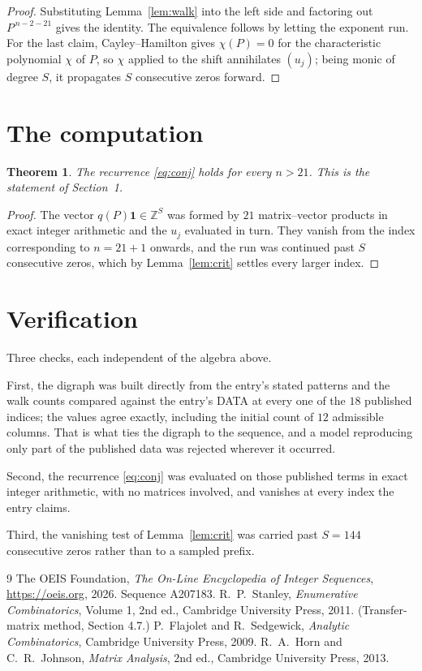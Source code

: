 \documentclass[11pt,a4paper]{article}
\theoremstyle{plain}
\newtheorem{theorem}{Theorem}
\theoremstyle{definition}
\begin{document}
\begin{proof}
Substituting Lemma~\ref{lem:walk} into the left side and factoring out
$P^{\,n-2-21}$ gives the identity. The equivalence follows by letting the exponent
run. For the last claim, Cayley--Hamilton gives $\chi(P)=0$ for the characteristic
polynomial $\chi$ of $P$, so $\chi$ applied to the shift annihilates $(u_j)$; being monic of
degree $S$, it propagates $S$ consecutive zeros forward.
\end{proof}

\section{The computation}

\begin{theorem}
The recurrence \eqref{eq:conj} holds for every $n>21$. This is the statement of
Section~1.
\end{theorem}

\begin{proof}
The vector $q(P)\mathbf{1}\in\mathbb{Z}^{S}$ was formed by $21$ matrix--vector
products in exact integer arithmetic and the $u_j$ evaluated in turn. They vanish from the
index corresponding to $n=21+1$ onwards, and the run was continued past $S$ consecutive
zeros, which by Lemma~\ref{lem:crit} settles every larger index.
\end{proof}

\section{Verification}

Three checks, each independent of the algebra above.

First, the digraph was built directly from the entry's stated patterns and the walk counts
compared against the entry's DATA at every one of the $18$ published indices; the
values agree exactly, including the initial count of $12$ admissible columns. That is
what ties the digraph to the sequence, and a model reproducing only part of the published
data was rejected wherever it occurred.

Second, the recurrence \eqref{eq:conj} was evaluated on those published terms in exact
integer arithmetic, with no matrices involved, and vanishes at every index the entry claims.

Third, the vanishing test of Lemma~\ref{lem:crit} was carried past $S=144$ consecutive
zeros rather than to a sampled prefix.

\begin{thebibliography}{9}
 The OEIS Foundation, \emph{The On-Line Encyclopedia of Integer
Sequences}, \url{https://oeis.org}, 2026. Sequence A207183.
 R.~P.~Stanley, \emph{Enumerative Combinatorics}, Volume 1, 2nd ed.,
Cambridge University Press, 2011. (Transfer-matrix method, Section 4.7.)
 P.~Flajolet and R.~Sedgewick, \emph{Analytic Combinatorics}, Cambridge
University Press, 2009.
 R.~A.~Horn and C.~R.~Johnson, \emph{Matrix Analysis}, 2nd ed., Cambridge
University Press, 2013.
\end{thebibliography}
\end{document}
